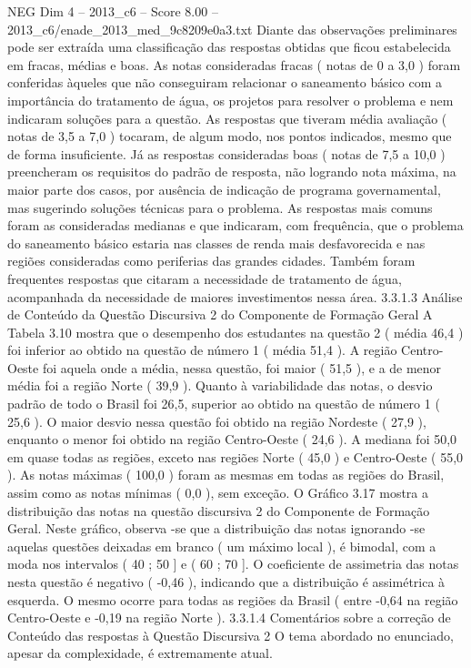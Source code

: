 \begin{textsample}{NEG Dim 4 – 2013\_c6 – Score 8.00 – 2013\_c6/enade\_2013\_med\_9c8209e0a3.txt}
Diante das observações preliminares pode ser extraída uma classificação das respostas obtidas que ficou estabelecida em fracas, médias e boas.
As notas consideradas fracas ( notas de 0 a 3,0 ) foram conferidas àqueles que não conseguiram relacionar o saneamento básico com a importância do tratamento de água, os projetos para resolver o problema e nem indicaram soluções para a questão.
As respostas que tiveram média avaliação ( notas de 3,5 a 7,0 ) tocaram, de algum modo, nos pontos indicados, mesmo que de forma insuficiente.
Já as respostas consideradas boas ( notas de 7,5 a 10,0 ) preencheram os requisitos do padrão de resposta, não logrando nota máxima, na maior parte dos casos, por ausência de indicação de programa governamental, mas sugerindo soluções técnicas para o problema.
As respostas mais comuns foram as consideradas medianas e que indicaram, com frequência, que o problema do saneamento básico estaria nas classes de renda mais desfavorecida e nas regiões consideradas como periferias das grandes cidades.
Também foram frequentes respostas que citaram a necessidade de tratamento de água, acompanhada da necessidade de maiores investimentos nessa área. 3.3.1.3 Análise de Conteúdo da Questão Discursiva 2 do Componente de Formação Geral A Tabela 3.10 mostra que o desempenho dos estudantes na questão 2 ( média 46,4 ) foi inferior ao obtido na questão de número 1 ( média 51,4 ).
A região Centro-Oeste foi aquela onde a média, nessa questão, foi maior ( 51,5 ), e a de menor média foi a região Norte ( 39,9 ).
Quanto à variabilidade das notas, o desvio padrão de todo o Brasil foi 26,5, superior ao obtido na questão de número 1 ( 25,6 ).
O maior desvio nessa questão foi obtido na região Nordeste ( 27,9 ), enquanto o menor foi obtido na região Centro-Oeste ( 24,6 ).
A mediana foi 50,0 em quase todas as regiões, exceto nas regiões Norte ( 45,0 ) e Centro-Oeste ( 55,0 ).
As notas máximas ( 100,0 ) foram as mesmas em todas as regiões do Brasil, assim como as notas mínimas ( 0,0 ), sem exceção.
O Gráfico 3.17 mostra a distribuição das notas na questão discursiva 2 do Componente de Formação Geral.
Neste gráfico, observa -se que a distribuição das notas ignorando -se aquelas questões deixadas em branco ( um máximo local ), é bimodal, com a moda nos intervalos ( 40 ; 50 ] e ( 60 ; 70 ].
O coeficiente de assimetria das notas nesta questão é negativo ( -0,46 ), indicando que a distribuição é assimétrica à esquerda.
O mesmo ocorre para todas as regiões da Brasil ( entre -0,64 na região Centro-Oeste e -0,19 na região Norte ). 3.3.1.4 Comentários sobre a correção de Conteúdo das respostas à Questão Discursiva 2 O tema abordado no enunciado, apesar da complexidade, é extremamente atual.

\end{textsample}
